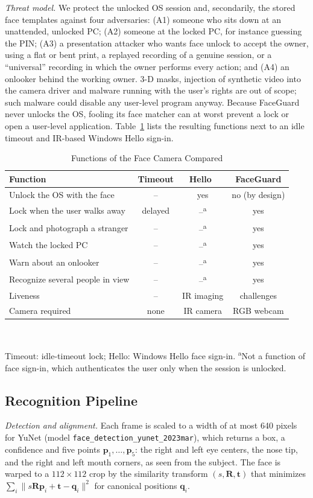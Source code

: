 \documentclass[journal]{IEEEtran}
\newcommand{\sys}{FaceGuard}
\begin{document}
\emph{Threat model.} We protect the unlocked OS session and, secondarily, the stored face templates against four adversaries: (A1) someone who sits down at an unattended, unlocked PC; (A2) someone at the locked PC, for instance guessing the PIN; (A3) a presentation attacker who wants face unlock to accept the owner, using a flat or bent print, a replayed recording of a genuine session, or a ``universal'' recording in which the owner performs every action; and (A4) an onlooker behind the working owner. 3-D masks, injection of synthetic video into the camera driver and malware running with the user's rights are out of scope; such malware could disable any user-level program anyway. Because \sys{} never unlocks the OS, fooling its face matcher can at worst prevent a lock or open a user-level application. Table~\ref{tab:compare} lists the resulting functions next to an idle timeout and IR-based Windows Hello sign-in.

\begin{table}[!t]
\centering
\caption{Functions of the Face Camera Compared}
\label{tab:compare}
\footnotesize
\setlength{\tabcolsep}{3pt}
\begin{tabular}{@{}lccc@{}}
\toprule
Function & Timeout & Hello~\cite{ms2024hello} & \sys{} \\
\midrule
Unlock the OS with the face & -- & yes & no (by design) \\
Lock when the user walks away & delayed & --\textsuperscript{a} & yes \\
Lock and photograph a stranger & -- & --\textsuperscript{a} & yes \\
Watch the locked PC & -- & --\textsuperscript{a} & yes \\
Warn about an onlooker & -- & --\textsuperscript{a} & yes \\
Recognize several people in view & -- & --\textsuperscript{a} & yes \\
Liveness & -- & IR imaging & challenges \\
Camera required & none & IR camera & RGB webcam \\
\bottomrule
\end{tabular}\\[2pt]
\raggedright\scriptsize Timeout: idle-timeout lock; Hello: Windows Hello face sign-in. \textsuperscript{a}Not a function of face sign-in, which authenticates the user only when the session is unlocked.
\end{table}

\subsection{Recognition Pipeline}
\emph{Detection and alignment.} Each frame is scaled to a width of at most 640 pixels for YuNet (model \texttt{face\_detection\_yunet\_2023mar}), which returns a box, a confidence and five points $\mathbf{p}_1,\dots,\mathbf{p}_5$: the right and left eye centers, the nose tip, and the right and left mouth corners, as seen from the subject. The face is warped to a $112\times112$ crop by the similarity transform $(s,\mathbf{R},\mathbf{t})$ that minimizes $\sum_i \lVert s\mathbf{R}\mathbf{p}_i+\mathbf{t}-\mathbf{q}_i\rVert^2$ for canonical positions $\mathbf{q}_i$.
\end{document}

